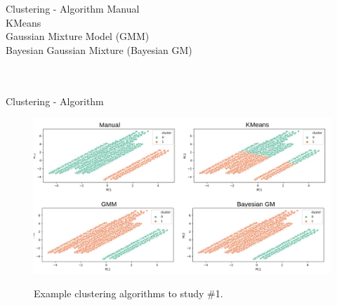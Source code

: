 %

\begin{frame}{Clustering - Algorithm} \pause
    Manual \\
    \vspace{0.5cm}
    KMeans \\  
    \vspace{0.5cm}
    Gaussian Mixture Model (GMM) \\ 
    \vspace{0.5cm}
    Bayesian Gaussian Mixture (Bayesian GM) \\
    \vspace{0.5cm}
     \\
    \vspace{0.5cm}
     \\
    \vspace{0.5cm}
\end{frame}


\begin{frame}{Clustering - Algorithm}
    \begin{figure}
        \centering
        \includegraphics[width=\linewidth]{fig/ch3-cluster-algo-ex1.png}
        \label{fig:cluster-algo-ex1}
        \caption{Example clustering algorithms to study \#1.} 
    \end{figure}
\end{frame}


